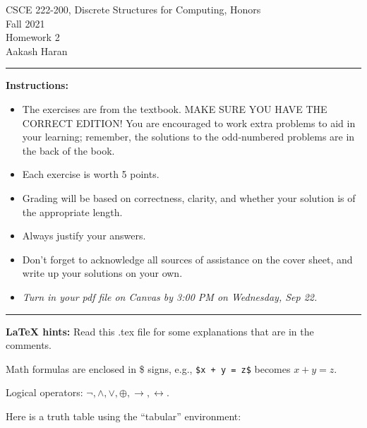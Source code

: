 \documentclass[12pt]{article}  %
\newcommand{\NOT}{\neg}
\newcommand{\AND}{\wedge}
\newcommand{\OR}{\vee}
\newcommand{\XOR}{\oplus}
\newcommand{\IMPLIES}{\rightarrow}
\newcommand{\IFF}{\leftrightarrow}
\begin{document}
\begin{center}         %
{\large                %
CSCE 222-200, Discrete Structures for Computing, Honors \\  %
Fall 2021 \\
Homework 2 \\
Aakash Haran}
\end{center}


\rule{6in}{.1pt}       %
                    
\noindent              %
{\bf Instructions:}    %

\begin{itemize}        %
\item The exercises are from the textbook.  MAKE SURE YOU HAVE THE CORRECT
      EDITION!  You are encouraged to work
      extra problems to aid in your learning; remember, the solutions to 
      the odd-numbered problems are in the back of the book.
\item Each exercise is worth 5 points.
\item Grading will be based on correctness, clarity, and whether your
      solution is of the appropriate length.
\item Always justify your answers.
\item Don't forget to acknowledge all sources of assistance on the cover
      sheet, and write up your solutions on your own.
\item {\em Turn in your pdf file on Canvas by 3:00 PM on Wednesday, 
      Sep 22.}
\end{itemize}

\rule{6in}{.1pt}       %

\noindent
{\bf LaTeX hints:}  Read this .tex file for some explanations that are in
the comments.

Math formulas are enclosed in \$ signs, e.g., {\tt \$x + y = z\$}
becomes $x + y = z$.

Logical operators: $\NOT, \AND, \OR, \XOR, \IMPLIES, \IFF$.

Here is a truth table using the ``tabular'' environment:
\end{document}
